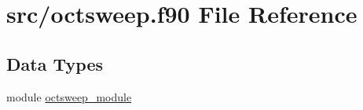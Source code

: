 \hypertarget{octsweep_8f90}{\section{src/octsweep.f90 File Reference}
\label{octsweep_8f90}
}
\subsection*{Data Types}
\begin{DoxyCompactItemize}
\item 
module \hyperlink{classoctsweep__module}{octsweep\-\_\-module}
\end{DoxyCompactItemize}
